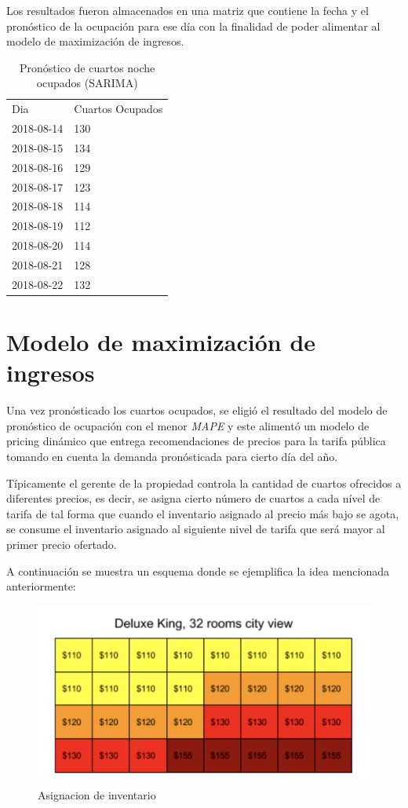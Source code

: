 Los resultados fueron almacenados en una matriz que contiene la fecha y el pronóstico de la ocupación para ese día con la finalidad de poder alimentar al modelo de maximización de ingresos.

\begin{table}[H]
\centering
\begin{tabular}{ll}
Dia        & Cuartos Ocupados \\
2018-08-14 & 130              \\
2018-08-15 & 134              \\
2018-08-16 & 129              \\
2018-08-17 & 123              \\
2018-08-18 & 114              \\
2018-08-19 & 112              \\
2018-08-20 & 114              \\
2018-08-21 & 128              \\
2018-08-22 & 132              
\end{tabular}
\caption{Pronóstico de cuartos noche ocupados (SARIMA)} 
\end{table}


\section*{Modelo de maximización de ingresos}

Una vez pronósticado los cuartos ocupados, se eligió el resultado del modelo de pronóstico de ocupación con el menor \emph{MAPE} y este alimentó un modelo de pricing dinámico que entrega recomendaciones de precios para la tarifa pública tomando en cuenta la demanda pronósticada para cierto día del año.

Típicamente el gerente de la propiedad controla la cantidad de cuartos ofrecidos a diferentes precios, es decir, se asigna cierto número de cuartos a cada nível de tarifa de tal forma que cuando el inventario asignado al precio más bajo se agota, se consume el inventario asignado al siguiente nivel de tarifa que será mayor al primer precio ofertado.

A continuación se muestra un esquema donde se ejemplifica la idea mencionada anteriormente:

\begin{figure}[H]
  \includegraphics[width=\linewidth]{Figures/buckets.png}
  \caption{Asignacion de inventario}
  \label{fig:Asignacion de Inventario}
\end{figure}

